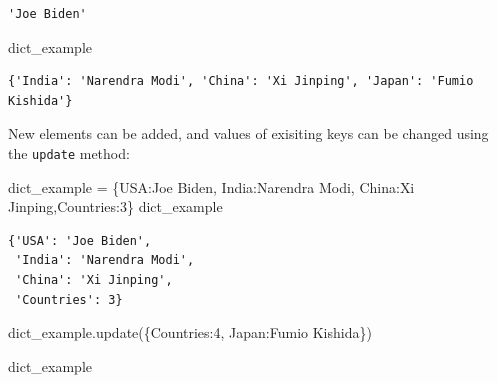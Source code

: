 \documentclass[
  letterpaper,
  DIV=11,
  numbers=noendperiod]{scrreprt}
\newenvironment{Shaded}{\begin{snugshade}}{\end{snugshade}}
\newcommand{\DecValTok}[1]{\textcolor[rgb]{0.68,0.00,0.00}{#1}}
\newcommand{\NormalTok}[1]{\textcolor[rgb]{0.00,0.23,0.31}{#1}}
\newcommand{\OperatorTok}[1]{\textcolor[rgb]{0.37,0.37,0.37}{#1}}
\newcommand{\StringTok}[1]{\textcolor[rgb]{0.13,0.47,0.30}{#1}}
\begin{document}
\begin{verbatim}
'Joe Biden'
\end{verbatim}

\begin{Shaded}
\begin{Highlighting}[]
\NormalTok{dict\_example}
\end{Highlighting}
\end{Shaded}

\begin{verbatim}
{'India': 'Narendra Modi', 'China': 'Xi Jinping', 'Japan': 'Fumio Kishida'}
\end{verbatim}

New elements can be added, and values of exisiting keys can be changed
using the \texttt{update} method:

\begin{Shaded}
\begin{Highlighting}[]
\NormalTok{dict\_example }\OperatorTok{=}\NormalTok{ \{}\StringTok{\textquotesingle{}USA\textquotesingle{}}\NormalTok{:}\StringTok{\textquotesingle{}Joe Biden\textquotesingle{}}\NormalTok{, }\StringTok{\textquotesingle{}India\textquotesingle{}}\NormalTok{:}\StringTok{\textquotesingle{}Narendra Modi\textquotesingle{}}\NormalTok{, }\StringTok{\textquotesingle{}China\textquotesingle{}}\NormalTok{:}\StringTok{\textquotesingle{}Xi Jinping\textquotesingle{}}\NormalTok{,}\StringTok{\textquotesingle{}Countries\textquotesingle{}}\NormalTok{:}\DecValTok{3}\NormalTok{\}}
\NormalTok{dict\_example}
\end{Highlighting}
\end{Shaded}

\begin{verbatim}
{'USA': 'Joe Biden',
 'India': 'Narendra Modi',
 'China': 'Xi Jinping',
 'Countries': 3}
\end{verbatim}

\begin{Shaded}
\begin{Highlighting}[]
\NormalTok{dict\_example.update(\{}\StringTok{\textquotesingle{}Countries\textquotesingle{}}\NormalTok{:}\DecValTok{4}\NormalTok{, }\StringTok{\textquotesingle{}Japan\textquotesingle{}}\NormalTok{:}\StringTok{\textquotesingle{}Fumio Kishida\textquotesingle{}}\NormalTok{\})}
\end{Highlighting}
\end{Shaded}

\begin{Shaded}
\begin{Highlighting}[]
\NormalTok{dict\_example}
\end{Highlighting}
\end{Shaded}
\end{document}
